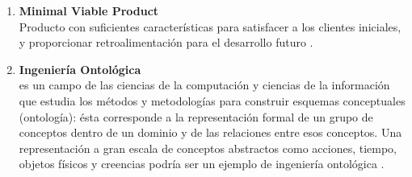 \begin{enumerate}
  \item \label{mvp} \textbf{Minimal Viable Product} \mbox{} \\ Producto con suficientes características para satisfacer a los clientes iniciales, y proporcionar retroalimentación para el desarrollo futuro \cite{mvp}.
  \item \label{ontoligical} \textbf{Ingeniería Ontológica} \mbox{} \\ es un campo de las ciencias de la computación y ciencias de la información que estudia los métodos y metodologías para construir esquemas conceptuales (ontología): ésta corresponde a la representación formal de un grupo de conceptos dentro de un dominio y de las relaciones entre esos conceptos. Una representación a gran escala de conceptos abstractos como acciones, tiempo, objetos físicos y creencias podría ser un ejemplo de ingeniería ontológica \cite{ontology_engineering}.
\end{enumerate}
